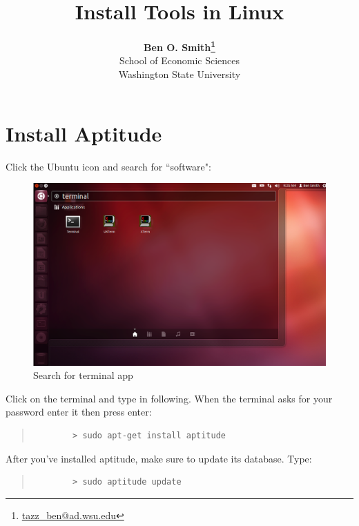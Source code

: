 \documentclass[11pt]{article}
\begin{document}
 

\title{Install Tools in Linux}
\date{}
\author{\textbf{Ben O. Smith\footnote{\href{mailto:tazz_ben@ad.wsu.edu}{tazz\_ben@ad.wsu.edu}}} \\
School of Economic Sciences \\
Washington State University}
\maketitle \doublespace

\section{Install Aptitude}

Click the Ubuntu icon and search for ``software":

\begin{figure}[!h]
	\centering
	\includegraphics[width=5in]{graphics/OpenTerminal.png}	\caption{Search for terminal app}
\end{figure}

Click on the terminal and type in following. When the terminal asks for your password enter it then press enter:

\begin{quote}
	\begin{verbatim}
		> sudo apt-get install aptitude
	\end{verbatim}
\end{quote}

After you've installed aptitude, make sure to update its database. Type:

\begin{quote}
	\begin{verbatim}
		> sudo aptitude update
	\end{verbatim}
\end{quote}
\end{document}
